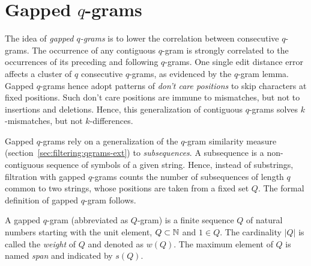 
\section{Gapped $q$-grams}
\label{sec:filtering:qgrams-gapped}

The idea of \emph{gapped $q$-grams} \citep{Burkhardt2001} is to lower the correlation between consecutive $q$-grams.
The occurrence of any contiguous $q$-gram is strongly correlated to the occurrences of its preceding and following $q$-grams.
One single edit distance error affects a cluster of $q$ consecutive $q$-grams, as evidenced by the $q$-gram lemma.
Gapped $q$-grams hence adopt patterns of \emph{don't care positions} to skip characters at fixed positions.
Such don't care positions are immune to mismatches, but not to insertions and deletions.
Hence, this generalization of contiguous $q$-grams solves $k$-mismatches, but not $k$-differences.


Gapped $q$-grams rely on a generalization of the $q$-gram similarity measure (section~\ref{sec:filtering:qgrams-ext}) to \emph{subsequences}.
A subsequence is a non-contiguous sequence of symbols of a given string.
Hence, instead of substrings, filtration with gapped $q$-grams counts the number of subsequences of length $q$ common to two strings, whose positions are taken from a fixed set $Q$.
The formal definition of gapped $q$-gram follows.

\begin{definition}
A gapped $q$-gram (abbreviated as $Q$-gram) is a finite sequence $Q$ of natural numbers starting with the unit element, \ie $Q \subset \mathbb {N}$ and $1 \in Q$.
The cardinality $|Q|$ is called the \emph{weight} of $Q$ and denoted as $w(Q)$.
The maximum element of $Q$ is named \emph{span} and indicated by $s(Q)$.
\end{definition}

